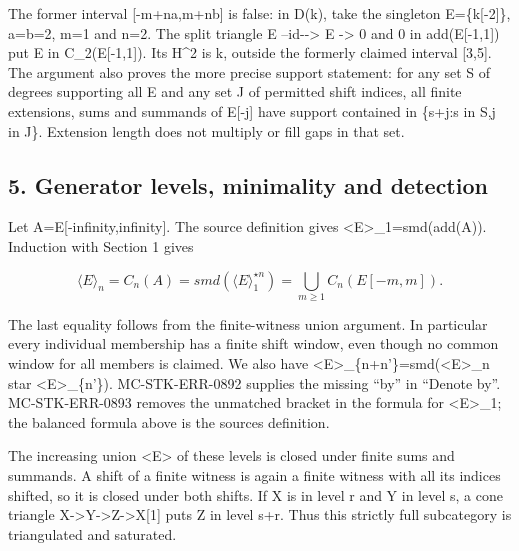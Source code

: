 \documentclass[11pt]{article}
\begin{document}
The former interval [-m\allowbreak{}+na,\allowbreak{}m\allowbreak{}+nb]\allowbreak{} is false:\allowbreak{} in D(k)\allowbreak{},\allowbreak{} take the singleton E\allowbreak{}=\{k[-2]\allowbreak{}\},\allowbreak{} a\allowbreak{}=b\allowbreak{}=2,\allowbreak{} m\allowbreak{}=1 and n\allowbreak{}=2. The split triangle E --id-\allowbreak{}-> E \allowbreak{}-> 0 and 0 in add(E[-1,\allowbreak{}1]\allowbreak{})\allowbreak{} put E in C\_\allowbreak{}2(E[-1,\allowbreak{}1]\allowbreak{})\allowbreak{}. Its H\^{}2 is k,\allowbreak{} outside the formerly claimed interval [3,\allowbreak{}5]\allowbreak{}. The argument also proves the more precise support statement:\allowbreak{} for any set S of degrees supporting all E and any set J of permitted shift indices,\allowbreak{} all finite extensions,\allowbreak{} sums and summands of E[-j]\allowbreak{} have support contained in \{s\allowbreak{}+j:\allowbreak{}s in S,\allowbreak{}j in J\}. Extension length does not multiply or fill gaps in that set.

\subsection{\texorpdfstring{5. Generator levels,\allowbreak{} minimality and detection}{5. Generator  minimality and detection}}\label{proofs-10691-11108-generator-levels-minimality-and-detection}

Let A\allowbreak{}=E[-infinity,\allowbreak{}infinity]\allowbreak{}. The source definition gives <E>\_\allowbreak{}1\allowbreak{}=smd(add(A)\allowbreak{})\allowbreak{}. Induction with Section 1 gives

\[
 \langle E\rangle_n=C_n(A)
 =smd(\langle E\rangle_1^{\star n})
 =\bigcup_{m\geq1}C_n(E[-m,m]).
\]

The last equality follows from the finite-witness union argument. In particular every individual membership has a finite shift window,\allowbreak{} even though no common window for all members is claimed. We also have <E>\_\allowbreak{}\{n\allowbreak{}+n'\}\allowbreak{}=smd(<E>\_\allowbreak{}n star <E>\_\allowbreak{}\{n'\})\allowbreak{}. MC-STK-ERR-0892 supplies the missing ``by'' in ``Denote by''. MC-STK-ERR-0893 removes the unmatched bracket in the formula for <E>\_\allowbreak{}1; the balanced formula above is the source\textquotesingle s definition.

The increasing union \textless E\textgreater{} of these levels is closed under finite sums and summands. A shift of a finite witness is again a finite witness with all its indices shifted,\allowbreak{} so it is closed under both shifts. If X is in level r and Y in level s,\allowbreak{} a cone triangle X\allowbreak{}->Y\allowbreak{}->Z\allowbreak{}->X[1]\allowbreak{} puts Z in level s\allowbreak{}+r. Thus this strictly full subcategory is triangulated and saturated.
\end{document}
